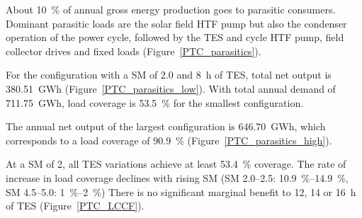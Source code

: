 About \SI{10}{\percent} of annual gross energy production goes to parasitic consumers. Dominant parasitic loads are the solar field HTF pump but also the condenser operation of the power cycle, followed by the TES and cycle HTF pump, field collector drives and fixed loads (Figure~\ref{PTC_parasitics}).

For the configuration with a SM of \num{2.0} and \SI{8}{h} of TES, total net output is \SI{380.51}{GWh} (Figure~\ref{PTC_parasitics_low}). With total annual demand of \SI{711.75}{GWh}, load coverage is \SI{53.5}{\percent} for the smallest configuration. 

The annual net output of the largest configuration is \SI{646.70}{GWh}, which corresponds to a load coverage of \SI{90.9}{\percent} (Figure~\ref{PTC_parasitics_high}).


At a SM of \num{2}, all TES variations achieve at least \SI{53.4}{\percent} coverage. The rate of increase in load coverage declines with rising SM (SM \numrange{2.0}{2.5}: \SIrange{10.9}{14.9}{\percent}, SM \numrange{4.5}{5.0}: \SIrange{1}{2}{\percent}) There is no significant marginal benefit to \num{12}, \num{14} or \SI{16}{h} of TES (Figure~\ref{PTC_LCCF}).

